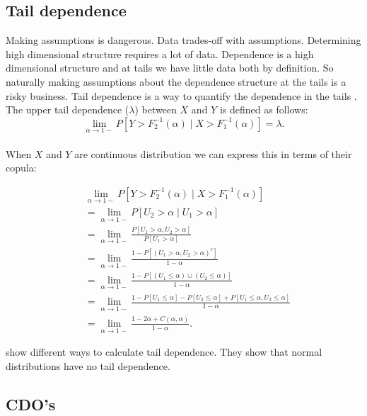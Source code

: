\documentclass[a4paper,12pt]{article}
\begin{document}
\subsection{Tail dependence}
Making assumptions is dangerous. Data trades-off with assumptions.
Determining high dimensional structure requires a lot of data.
Dependence is a high dimensional structure and at
tails we have little data both by definition. So naturally making
assumptions about the dependence structure at the tails is a risky business.
Tail dependence is a way to quantify the dependence in the tails .
The upper tail dependence ($\lambda$) between $X$ and $Y$ is defined as follows:
\begin{equation}
    \lim_{\alpha \to 1-}  P[ Y > F_{2}^{-1} ( \alpha) \mid X > F_{1}^{-1} ( \alpha) ]=\lambda.
\end{equation} \\
When $X$ and $Y$ are continuous distribution we can express this in terms
of their copula:

\begin{align}
     & \lim_{\alpha \to 1-}  P[ Y > F_{2}^{-1} ( \alpha) \mid X > F_{1}^{-1} ( \alpha) ]                                          \\
     & =\lim_{\alpha \to 1-}  P[ U_{2} >  \alpha \mid U_{1} >  \alpha ]                                                           \\
     & =\lim_{\alpha \to 1-}  \frac{P[U_{1}>\alpha,U_{2}>\alpha]}{P[U_{1}>\alpha]}                                                \\
     & =\lim_{\alpha \to 1-}  \frac{1 - P[(U_{1}>\alpha,U_{2}>\alpha)^{c}]}{1-\alpha}                                             \\
     & =\lim_{\alpha \to 1-}  \frac{1 - P[(U_{1}\le \alpha) \cup ( U_{2}\le\alpha)]}{1-\alpha}                                    \\
     & =\lim_{\alpha \to 1-}  \frac{1 - P[U_{1}\le \alpha] - P[U_{2}\le \alpha]  + P[U_{1}\le \alpha , U_{2}\le\alpha]}{1-\alpha} \\
     & =\lim_{\alpha\to1-} \frac{1-2 \alpha +C(\alpha,\alpha)} {1-\alpha}.
\end{align}

\cite{dempster_correlation_2002} show different ways to calculate tail dependence. They show
that normal distributions have no tail dependence.

\subsection{CDO's}
\end{document}
